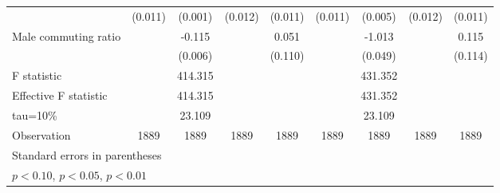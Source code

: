 \begin{tabular}{l*{8}{c}}
                    &     (0.011)         &     (0.001)         &     (0.012)         &     (0.011)         &     (0.011)         &     (0.005)         &     (0.012)         &     (0.011)         \\
\addlinespace
Male commuting ratio&                     &      -0.115\sym{***}&                     &       0.051         &                     &      -1.013\sym{***}&                     &       0.115         \\
                    &                     &     (0.006)         &                     &     (0.110)         &                     &     (0.049)         &                     &     (0.114)         \\
\hline
F statistic         &                     &     414.315         &                     &                     &                     &     431.352         &                     &                     \\
Effective F statistic&                     &     414.315         &                     &                     &                     &     431.352         &                     &                     \\
tau=10\%            &                     &      23.109         &                     &                     &                     &      23.109         &                     &                     \\
Observation         &        1889         &        1889         &        1889         &        1889         &        1889         &        1889         &        1889         &        1889         \\
\bottomrule \multicolumn{9}{l}{\footnotesize Standard errors in parentheses}\\ \multicolumn{8}{l}{\footnotesize \sym{*} \(p<0.10\), \sym{**} \(p<0.05\), \sym{***} \(p<0.01\)} \end{tabular}
